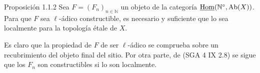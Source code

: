 \begin{statement}{Proposición 1.1.2}
Sea \(F=(F_n)_{n\in\mathbb N}\) un objeto de la categoría \(\underline{\operatorname{Hom}}(\mathbb N^\circ,\operatorname{Ab}(X))\). Para que \(F\) sea \(\ell\)-ádico constructible, es necesario y suficiente que lo sea localmente para la topología étale de \(X\).
\end{statement}

\begin{prooftext}[Demostración]
Es claro que la propiedad de \(F\) de ser \(\ell\)-ádico se comprueba sobre un recubrimiento del objeto final del sitio. Por otra parte, de (SGA 4 IX 2.8) se sigue que los \(F_n\) son constructibles si lo son localmente.
\end{prooftext}
